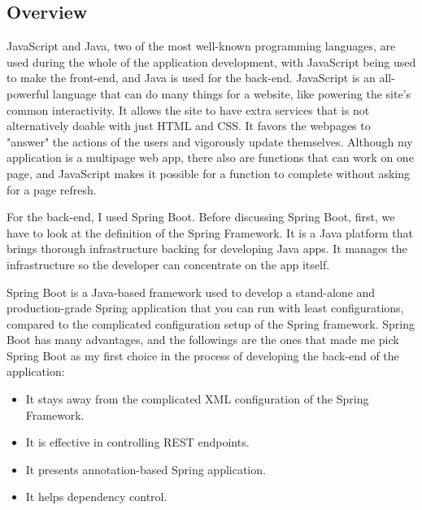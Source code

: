 \documentclass[a4paper, 11pt,openany]{book} %
\begin{document}
\subsection{Overview}
JavaScript and Java, two of the most well-known programming languages, are used during the whole of the application development, with JavaScript being used to make the front-end, and Java is used for the back-end. JavaScript is an all-powerful language that can do many things for a website, like powering the site's common interactivity. It allows the site to have extra services that is not alternatively doable with just HTML and CSS. It favors the webpages to "answer" the actions of the users and vigorously update themselves. Although my application is a multipage web app, there also are functions that can work on one page, and JavaScript makes it possible for a function to complete without asking for a page refresh.\cite{js2} \par
For the back-end, I used Spring Boot. Before discussing Spring Boot, first, we have to look at the definition of the Spring Framework. It is a Java platform that brings thorough infrastructure backing for developing Java apps. It manages the infrastructure so the developer can concentrate on the app itself.\cite{spring} \par
Spring Boot is a Java-based framework used to develop a stand-alone and production-grade Spring application that you can run with least configurations, compared to the complicated configuration setup of the Spring framework.
Spring Boot has many advantages, and the followings are the ones that made me pick Spring Boot as my first choice in the process of developing the back-end of the application:
\begin{itemize}
    \item It stays away from the complicated XML configuration of the Spring Framework.
    \item It is effective in controlling REST endpoints.
    \item It presents annotation-based Spring application.
    \item It helps dependency control.\cite{springboot}
\end{itemize}
\end{document}

